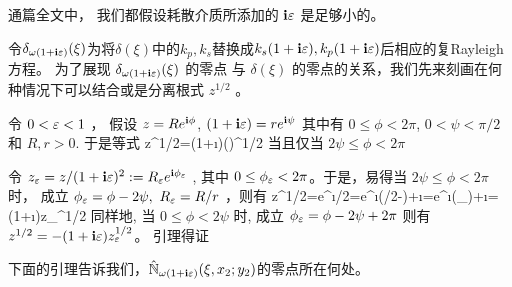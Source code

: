\begin{remark}
	通篇全文中， 我们都假设耗散介质所添加的 $\mathbf{i}\varepsilon$ 是足够小的。
\end{remark}
令$\delta_{\omega(1+\mathbf{i}\varepsilon)}(\xi)$为将$\delta(\xi)$中的$k_p,k_s$替换成$k_s(1+\mathbf{i}\varepsilon), k_p(1+\mathbf{i}\varepsilon)$后相应的复Rayleigh方程。 为了展现 $\delta_{\omega(1+\mathbf{i}\varepsilon)}(\xi)$ 的零点 与 $\delta(\xi)$ 的零点的关系，我们先来刻画在何种情况下可以结合或是分离根式 $z^{1/2}$ 。
\begin{lem}\label{lem23}
	令 $0<\varepsilon<1$ ， 假设 $z=R e^{\mathbf{i}\phi}$, $(1+\mathbf{i}\varepsilon)=r e^{\mathbf{i}\psi}$ 其中有 $0\leq\phi<2\pi$, $0<\psi<\pi/2$ 和  $R,r>0$. 于是等式
	\be
	z^{1/2}=(1+\i\varepsilon)()^{1/2}
	\ee
	当且仅当  $2\psi\leq\phi<2\pi$
\end{lem}
\debproof
令 $z_\varepsilon=z/(1+\mathbf{i}\varepsilon)^2:=R_\varepsilon e^{\mathbf{i}\phi_\varepsilon}$ , 其中 $0\leq\phi_\varepsilon<2\pi$。于是，易得当 $2\psi\leq\phi<2\pi$ 时， 成立 $\phi_\ep=\phi-2\psi , \ R_\ep=R/r$ ，则有
\ben
z^{1/2}=e^{\i\phi/2}=e^{\i(\phi/2-\psi)+\i\psi}=e^{\i(\phi_\ep)+\i\psi}=(1+\i\ep)z_\ep^{1/2}
\een
同样地, 当 $0\leq\phi<2\psi$ 时, 成立 $\phi_\varepsilon=\phi-2\psi+2\pi$ 则有 $z^{1/2}=-(1+\mathbf{i}\varepsilon)z_\varepsilon^{1/2}$。 引理得证
\finproof

下面的引理告诉我们，$\hat{\mathbb{N}}_{\omega(1+\mathbf{i}\varepsilon)}(\xi,x_2;y_2)$的零点所在何处。

